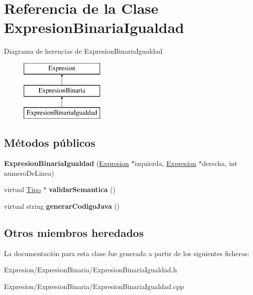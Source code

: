 \hypertarget{class_expresion_binaria_igualdad}{\section{Referencia de la Clase Expresion\-Binaria\-Igualdad}
\label{class_expresion_binaria_igualdad}
}
Diagrama de herencias de Expresion\-Binaria\-Igualdad\begin{figure}[H]
\begin{center}
\leavevmode
\includegraphics[height=3.000000cm]{class_expresion_binaria_igualdad}
\end{center}
\end{figure}
\subsection*{Métodos públicos}
\begin{DoxyCompactItemize}
\item 
\hypertarget{class_expresion_binaria_igualdad_adf79611697265d0ca2d0c52efcf187b9}{{\bfseries Expresion\-Binaria\-Igualdad} (\hyperlink{class_expresion}{Expresion} $\ast$izquierda, \hyperlink{class_expresion}{Expresion} $\ast$derecha, int numero\-De\-Linea)}\label{class_expresion_binaria_igualdad_adf79611697265d0ca2d0c52efcf187b9}

\item 
\hypertarget{class_expresion_binaria_igualdad_ae0d7151da1bf22098745fe207285deee}{virtual \hyperlink{class_tipo}{Tipo} $\ast$ {\bfseries validar\-Semantica} ()}\label{class_expresion_binaria_igualdad_ae0d7151da1bf22098745fe207285deee}

\item 
\hypertarget{class_expresion_binaria_igualdad_aed73c6d738fd0ff3cdb901eac690434c}{virtual string {\bfseries generar\-Codigo\-Java} ()}\label{class_expresion_binaria_igualdad_aed73c6d738fd0ff3cdb901eac690434c}

\end{DoxyCompactItemize}
\subsection*{Otros miembros heredados}


La documentación para esta clase fue generada a partir de los siguientes ficheros\-:\begin{DoxyCompactItemize}
\item 
Expresion/\-Expresion\-Binaria/Expresion\-Binaria\-Igualdad.\-h\item 
Expresion/\-Expresion\-Binaria/Expresion\-Binaria\-Igualdad.\-cpp\end{DoxyCompactItemize}
